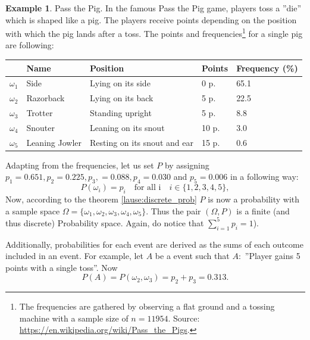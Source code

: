 \documentclass[12pt,a4paper,leqno]{report}
\theoremstyle{plain}
\theoremstyle{definition}
\newtheorem{esim}[equation]{Example}
\begin{document}
\begin{esim}
\label{esim:passthepig1}
Pass the Pig. In the famous Pass the Pig game, players toss a ''die'' which is shaped like a pig. The players receive points depending on the position with which the pig lands after a toss. The points and frequencies\footnote{The frequencies are gathered by observing a flat ground and a tossing machine with a sample size of $n=11954$. Source: \url{https://en.wikipedia.org/wiki/Pass_the_Pigs}.} for a single pig are following:

\bigskip
\bigskip

\begin{tabular}{l l L{4cm} l l}
\toprule
& Name & Position & Points & Frequency (\%)\\
\midrule
$\omega_1$ & Side & Lying on its side  & 0 p. & 65.1\\
$\omega_2$ & Razorback & Lying on its back & 5 p. & 22.5\\
$\omega_3$ & Trotter & Standing upright & 5 p. & 8.8\\
$\omega_4$ & Snouter & Leaning on its snout & 10 p. & 3.0\\
$\omega_5$ & Leaning Jowler & Resting on its snout and ear & 15 p. &  0.6\\
\bottomrule 
\end{tabular}

\bigskip
\bigskip

Adapting from the frequencies, let us set $P$ by assigning $p_1 = 0.651, p_2=0.225, p_3, = 0.088, p_4 = 0.030$ and $p_5 = 0.006$ in a following way: 
\[
P(\omega_i) = p_i \quad \text{for all i} \quad i \in \{1,2,3,4,5\},
\]
Now, according to the theorem \ref{lause:discrete_prob} $P$ is now a probability with a sample space $\Omega = \{\omega_1, \omega_2, \omega_3, \omega_4, \omega_5\}$. Thus the pair $(\Omega, P)$ is a finite (and thus discrete) Probability space. Again, do notice that  $\sum_{i=1}^5 p_i = 1$).

Additionally, probabilities for each event are derived as the sums of each outcome included in an event. For example, let $A$ be a event such that $A:$ ''Player gains 5 points with a single toss''. Now 
\[
P(A) = P(\omega_2, \omega_3) = p_2 + p_3 = 0.313.
\] 
\end{esim}
\end{document}
